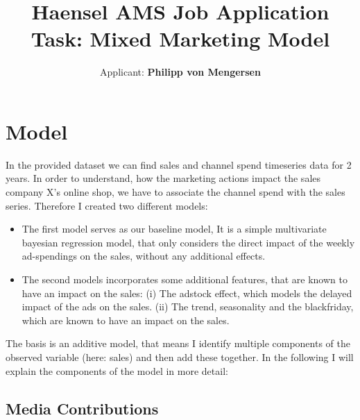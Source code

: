 \documentclass{article}
\title{Haensel AMS Job Application Task: Mixed Marketing Model}
\author{Applicant: \textbf{Philipp von Mengersen}}
\begin{document}
\maketitle

\small







\section{Model}
In the provided dataset we can find sales and channel spend timeseries data for 2 years. 
In order to understand, how the marketing actions impact the sales company X's online shop, we have to associate the channel spend with the sales series.
Therefore I created two different models:
\begin{itemize}
    \item  The first model serves as our baseline model, It is a simple multivariate bayesian regression model, 
    that only considers the direct impact of the weekly ad-spendings on the sales, without any additional effects.
    \item The second models incorporates some additional features, that are known to have an impact on the sales:
    (i) The adstock effect, which models the delayed impact of the ads on the sales.
    (ii) The trend, seasonality and the blackfriday, which are known to have an impact on the sales.
\end{itemize}

The basis is an additive model, that means I identify multiple components of the observed variable (here: sales) and then add these together.
In the following I will explain the components of the model in more detail:

\subsection{Media Contributions}
\end{document}
